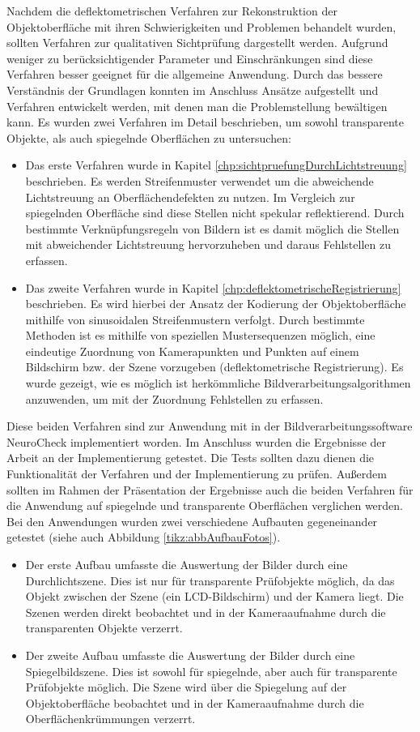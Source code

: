 \p
Nachdem die deflektometrischen Verfahren zur Rekonstruktion der Objektoberfläche mit ihren Schwierigkeiten und Problemen behandelt wurden, sollten Verfahren zur qualitativen Sichtprüfung dargestellt werden.
Aufgrund weniger zu berücksichtigender Parameter und Einschränkungen sind diese Verfahren besser geeignet für die allgemeine Anwendung.
Durch das bessere Verständnis der Grundlagen konnten im Anschluss Ansätze aufgestellt und Verfahren entwickelt werden, mit denen man die Problemstellung bewältigen kann.
Es wurden zwei Verfahren im Detail beschrieben, um sowohl transparente Objekte, als auch spiegelnde Oberflächen zu untersuchen:
%
\begin{itemize}
	\item Das erste Verfahren wurde in Kapitel \ref{chp:sichtpruefungDurchLichtstreuung} beschrieben. Es werden Streifenmuster verwendet um die abweichende Lichtstreuung an Oberflächendefekten zu nutzen. Im Vergleich zur spiegelnden Oberfläche sind diese Stellen nicht spekular reflektierend. Durch bestimmte Verknüpfungsregeln von Bildern ist es damit möglich die Stellen mit abweichender Lichtstreuung hervorzuheben und daraus Fehlstellen zu erfassen.
	
	\item Das zweite Verfahren wurde in Kapitel \ref{chp:deflektometrischeRegistrierung} beschrieben. Es wird hierbei der Ansatz der Kodierung der Objektoberfläche mithilfe von sinusoidalen Streifenmustern verfolgt. Durch bestimmte Methoden ist es mithilfe von speziellen Mustersequenzen möglich, eine eindeutige Zuordnung von Kamerapunkten und Punkten auf einem Bildschirm bzw. der Szene vorzugeben (deflektometrische Registrierung). Es wurde gezeigt, wie es möglich ist herkömmliche Bildverarbeitungsalgorithmen anzuwenden, um mit der Zuordnung Fehlstellen zu erfassen.
\end{itemize}
%
Diese beiden Verfahren sind zur Anwendung mit in der Bildverarbeitungssoftware NeuroCheck implementiert worden.
Im Anschluss wurden die Ergebnisse der Arbeit an der Implementierung getestet.
Die Tests sollten dazu dienen die Funktionalität der Verfahren und der Implementierung zu prüfen.
Außerdem sollten im Rahmen der Präsentation der Ergebnisse auch die beiden Verfahren für die Anwendung auf spiegelnde und transparente Oberflächen verglichen werden.
Bei den Anwendungen wurden zwei verschiedene Aufbauten gegeneinander getestet (siehe auch Abbildung \ref{tikz:abbAufbauFotos}).
%
\begin{itemize}
	\item Der erste Aufbau umfasste die Auswertung der Bilder durch eine Durchlichtszene. Dies ist nur für transparente Prüfobjekte möglich, da das Objekt zwischen der Szene (ein LCD-Bildschirm) und der Kamera liegt. Die Szenen werden direkt beobachtet und in der Kameraaufnahme durch die transparenten Objekte verzerrt.
	
	\item Der zweite Aufbau umfasste die Auswertung der Bilder durch eine Spiegelbildszene. Dies ist sowohl für spiegelnde, aber auch für transparente Prüfobjekte möglich. Die Szene wird über die Spiegelung auf der Objektoberfläche beobachtet und in der Kameraaufnahme durch die Oberflächenkrümmungen verzerrt.
\end{itemize}
